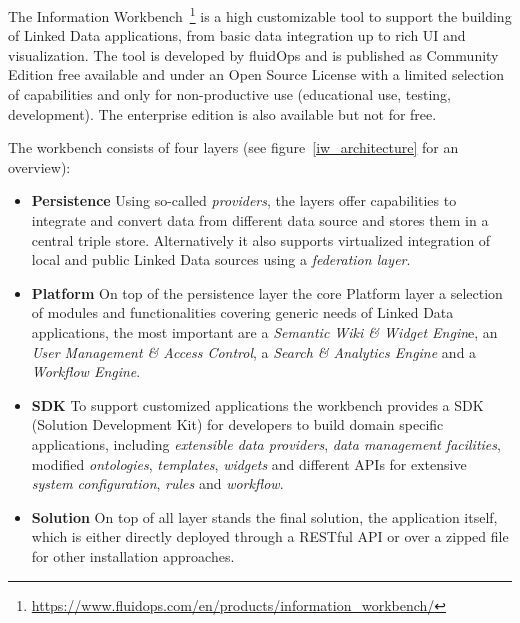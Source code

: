 The Information Workbench~\footnote{\url{https://www.fluidops.com/en/products/information_workbench/}} is a high customizable tool to support the building of Linked Data applications, from basic data integration up to rich UI and visualization. The tool is developed by fluidOps and is published as Community Edition free available and under an Open Source License with a limited selection of capabilities and only for non-productive use (educational use, testing, development). The enterprise edition is also available but not for free.

\newpage

The workbench consists of four layers (see figure~\ref{iw_architecture} for an overview):~\cite{haase2011information}~\cite{gossenainformation}

\begin{itemize}

\item \textbf{Persistence}
Using so-called \emph{providers}, the layers offer capabilities to integrate and convert data from different data source and stores them in a central triple store. Alternatively it also supports virtualized integration of local and public Linked Data sources using a \emph{federation layer}.

\item \textbf{Platform}
On top of the persistence layer the core Platform layer a selection of modules and functionalities covering generic needs of Linked Data applications, the most important are a \emph{Semantic Wiki \& Widget Engin}e, an \emph{User Management \& Access Control}, a \emph{Search \& Analytics Engine} and a \emph{Workflow Engine}.

\item \textbf{SDK} To support customized applications the workbench provides a SDK (Solution Development Kit) for developers to build domain specific applications, including \emph{extensible data providers}, \emph{data management facilities}, modified \emph{ontologies}, \emph{templates}, \emph{widgets} and different APIs for extensive \emph{system configuration}, \emph{rules} and \emph{workflow}.

\item \textbf{Solution}
On top of all layer stands the final solution, the application itself, which is either directly deployed through a RESTful API or over a zipped file for other installation approaches.

\end{itemize}

